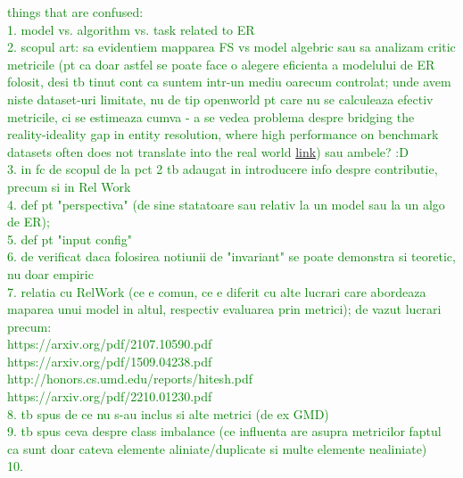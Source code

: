 \documentclass[journal]{IEEEtran}
\begin{document}
    \textcolor{green}{things that are confused:\\
    1. model vs. algorithm vs. task related to ER\\
    2. scopul art: sa evidentiem mapparea FS vs model algebric sau sa analizam critic metricile (pt ca doar astfel se poate face o alegere eficienta a modelului de ER folosit, desi tb tinut cont ca suntem intr-un mediu oarecum controlat; unde avem niste dataset-uri limitate, nu de tip openworld pt care nu se calculeaza efectiv metricile, ci se estimeaza cumva - a se vedea problema despre bridging
    the reality-ideality gap in entity resolution, where high performance on benchmark datasets often does not
    translate into the real world \href{https://arxiv.org/pdf/2205.05889.pdf}{link}) sau ambele? :D\\
    3. in fc de scopul de la pct 2 tb adaugat in introducere info despre contributie, precum si in Rel Work\\
    4. def pt "perspectiva" (de sine statatoare sau relativ la un model sau la un algo de ER); \\
    5. def pt "input config" \\
    6. de verificat daca folosirea notiunii de "invariant" se poate demonstra si teoretic, nu doar empiric\\
    7. relatia cu RelWork (ce e comun, ce e diferit cu alte lucrari care abordeaza maparea unui model in altul, respectiv evaluarea prin metrici); de vazut lucrari precum:\\
    https://arxiv.org/pdf/2107.10590.pdf \\
    https://arxiv.org/pdf/1509.04238.pdf\\
    http://honors.cs.umd.edu/reports/hitesh.pdf\\
    https://arxiv.org/pdf/2210.01230.pdf\\
    8. tb spus de ce nu s-au inclus si alte metrici (de ex GMD)\\
    9. tb spus ceva despre class imbalance (ce influenta are asupra metricilor faptul ca sunt doar cateva elemente aliniate/duplicate si multe elemente nealiniate)\\
    10.
    }
    
    
    
\end{document}
